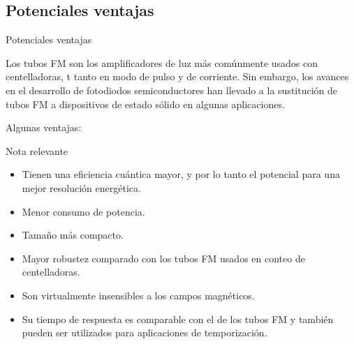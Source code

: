\documentclass[a4paper,10pt]{beamer}
\begin{document}
\subsection{Potenciales ventajas}
\begin{frame}{Potenciales ventajas}
 
 \begin{justify}
  Los tubos FM son los amplificadores de luz más comúnmente usados con centelladoras, t
  tanto en modo de pulso y de corriente. Sin embargo, los avances en el desarrollo de 
  fotodiodos semiconductores han llevado a la sustitución de tubos FM a dispositivos de 
  estado sólido en algunas aplicaciones.
 \end{justify}
 
 {\large{\color{blue}Algunas ventajas}:}
 
 \begin{block}{Nota relevante}
  \begin{itemize}[<+->]
   \item \begin{justify}
          Tienen una eficiencia cuántica mayor, y por lo tanto el potencial para 
          una mejor resolución energética.
         \end{justify}
  \item  \begin{justify}
          Menor consumo de potencia.
         \end{justify}
  \item  \begin{justify}
          Tamaño más compacto.
         \end{justify}
  \item  \begin{justify}
	  Mayor robustez comparado con los tubos FM usados en conteo de centelladoras.
         \end{justify}
  \item  \begin{justify}
	  Son virtualmente insensibles a los campos magnéticos.
         \end{justify}
  \item  \begin{justify}
	  Su tiempo de respuesta es comparable con el de los tubos FM y también 
	  pueden ser utilizados para aplicaciones de temporización.
         \end{justify}
 
  \end{itemize}
 \end{block}
 
\end{frame}
\end{document}
